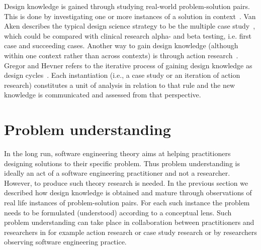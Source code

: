\documentclass[graybox]{svmult}
\begin{document}
Design knowledge is gained through studying real-world problem-solution pairs. This is done by investigating one or more instances of a solution in context~\cite{wieringa_what_2014}. Van Aken describes the typical design science strategy to be the multiple case study~\cite{van_aken_management_2004}, which could be compared with clinical research alpha- and beta testing, i.e. first case and succeeding cases.
Another way to gain design knowledge (although within one context rather than across contexts) is through action research~\cite{wieringa_technical_2012}. Gregor and Hevner refers to the iterative process of gaining design knowledge as design cycles~\cite{gregor_positioning_2013}. Each instantiation (i.e., a case study or an iteration of action research) constitutes a unit of analysis in relation to that rule and the new knowledge is communicated and assessed from that perspective. 


\section{Problem understanding}




In the long run, software engineering theory aims at helping practitioners designing solutions to their specific problem. Thus problem understanding is ideally an act of a software engineering practitioner and not a researcher. However, to produce such theory research is needed. In the previous section we described how design knowledge is obtained and mature through observations of real life instances of problem-solution pairs. For each such instance the problem needs to be formulated (understood) according to a conceptual lens. Such problem understanding can take place in collaboration between practitioners and researchers in for example action research or case study research or by researchers observing software engineering practice.

\end{document}
